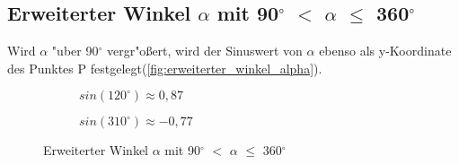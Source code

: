 \documentclass{standalone}
\begin{document}
\subsection{Erweiterter Winkel $\alpha$ mit 90$^\circ$  $<$ $\alpha$ $\leq$ 360$^\circ$ }

\noindent Wird $\alpha$ {"u}ber 90$^\circ$  vergr{"o}{\ss}ert, wird der Sinuswert von $\alpha$ ebenso als y-Koordinate des Punktes P festgelegt(\autoref{fig:erweiterter_winkel_alpha}).

\begin{figure}[h!]
  \centering
  \begin{subfigure}[b]{0.5\linewidth}
    \def\svgwidth{220px}
    
    \caption{$sin(120^\circ ) \approx 0,87$}
    \label{fig:sin_120_087}
  \end{subfigure}
  \begin{subfigure}[b]{0.35\linewidth}
    \def\svgwidth{220px}
    
    \caption{$sin(310^\circ ) \approx -0,77$}
    \label{fig:sin_310_-_077}
  \end{subfigure}
  \caption{Erweiterter Winkel $\alpha$ mit 90$^\circ$  $<$ $\alpha$ $\leq$ 360$^\circ$ }
  \label{fig:erweiterter_winkel_alpha}
\end{figure}
\end{document}
